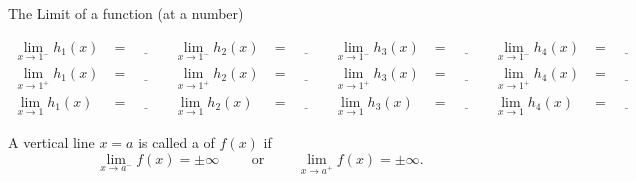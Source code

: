 \documentclass[../main.tex]{subfiles}
\begin{document}
\begin{lesson}{The Limit of a function (at a number)}
\begin{center}
  \end{center}
  \begin{align*}
    \lim_{x \to 1^{-}} h_{1}(x) 
    &= \underline{\hspace{1cm}} 
    & \lim_{x \to 1^{-}} h_{2}(x) 
    &= \underline{\hspace{1cm}} 
    & \lim_{x \to 1^{-}} h_{3}(x) 
    &= \underline{\hspace{1cm}} 
    & \lim_{x \to 1^{-}} h_{4}(x) 
    &= \underline{\hspace{1cm}} \\[2ex]
    \lim_{x \to 1^{+}} h_{1}(x) 
    &= \underline{\hspace{1cm}} 
    & \lim_{x \to 1^{+}} h_{2}(x) 
    &= \underline{\hspace{1cm}} 
    & \lim_{x \to 1^{+}} h_{3}(x) 
    &= \underline{\hspace{1cm}} 
    & \lim_{x \to 1^{+}} h_{4}(x) 
    &= \underline{\hspace{1cm}} \\[2ex]
    \lim_{x \to 1} h_{1}(x) 
    &= \underline{\hspace{1cm}} 
    & \lim_{x \to 1} h_{2}(x) 
    &= \underline{\hspace{1cm}} 
    & \lim_{x \to 1} h_{3}(x) 
    &= \underline{\hspace{1cm}} 
    & \lim_{x \to 1} h_{4}(x) 
    &= \underline{\hspace{1cm}}
  \end{align*}
  
  A vertical line \(x = a\) is called a  of \(f(x)\) if
  \[
    \lim_{x \to a^{-}} f(x) = \pm \infty \qquad\text{ or }\qquad \lim_{x \to a^{+}} f(x) = \pm \infty.
  \]
  \clearpage


\end{lesson}
\end{document}
